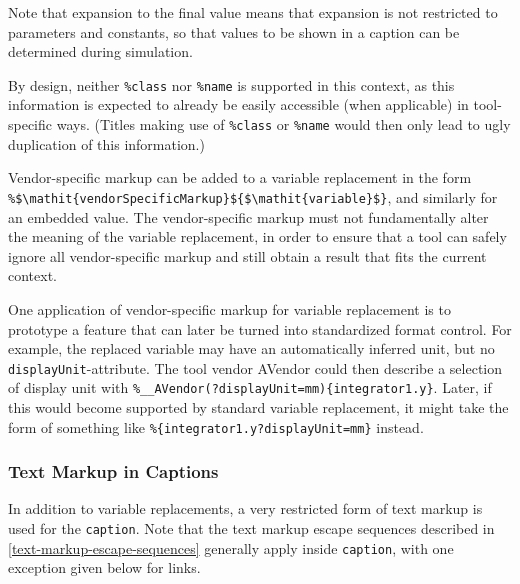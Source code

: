 Note that expansion to the final value means that expansion is not restricted to parameters and constants, so that values to be shown in a caption can be determined during simulation.

\begin{nonnormative}
By design, neither \lstinline!%class! nor \lstinline!%name! is supported in this context, as this information is expected to already be easily accessible (when applicable) in tool-specific ways.
(Titles making use of \lstinline!%class! or \lstinline!%name! would then only lead to ugly duplication of this information.)
\end{nonnormative}

Vendor-specific markup can be added to a variable replacement in the form \lstinline!%$\mathit{vendorSpecificMarkup}${$\mathit{variable}$}!, and similarly for an embedded value.
The vendor-specific markup must not fundamentally alter the meaning of the variable replacement, in order to ensure that a tool can safely ignore all vendor-specific markup and still obtain a result that fits the current context.

\begin{example}
One application of vendor-specific markup for variable replacement is to prototype a feature that can later be turned into standardized format control.
For example, the replaced variable may have an automatically inferred unit, but no \lstinline!displayUnit!-attribute.
The tool vendor AVendor could then describe a selection of display unit with \lstinline!%__AVendor(?displayUnit=mm){integrator1.y}!.
Later, if this would become supported by standard variable replacement, it might take the form of something like \lstinline!%{integrator1.y?displayUnit=mm}! instead.
\end{example}

\subsubsection{Text Markup in Captions}\label{text-markup-in-captions}

In addition to variable replacements, a very restricted form of text markup is used for the \lstinline!caption!.
Note that the text markup escape sequences described in \cref{text-markup-escape-sequences} generally apply inside \lstinline!caption!, with one exception given below for links.


